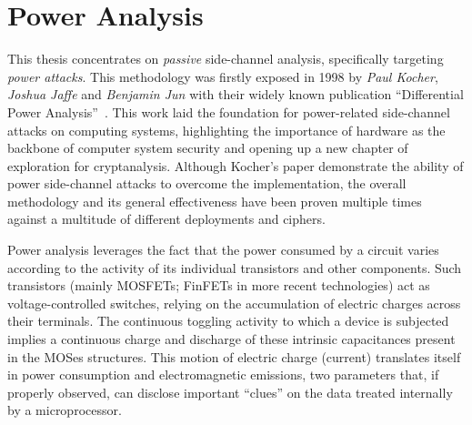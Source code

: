     \section{Power Analysis}\label{sec:pow}
        This thesis concentrates on \emph{passive} side-channel analysis, specifically targeting \emph{power attacks}. This methodology was firstly exposed in 1998 by \emph{Paul Kocher}, \emph{Joshua Jaffe} and \emph{Benjamin Jun} with their widely known publication ``Differential Power Analysis''~\cite{kocher1999differential}. This work laid the foundation for power-related side-channel attacks on computing systems, highlighting the importance of hardware as the backbone of computer system security and opening up a new chapter of exploration for cryptanalysis. Although Kocher's paper demonstrate the ability of power side-channel attacks to overcome the \des{} implementation, the overall methodology and its general effectiveness have been proven multiple times against a multitude of different deployments and ciphers. 
        
        Power analysis leverages the fact that the power consumed by a circuit varies according to the activity of its individual transistors and other components. Such transistors (mainly MOSFETs; FinFETs in more recent technologies) act as voltage-controlled switches, relying on the accumulation of electric charges across their terminals. The continuous toggling activity to which a device is subjected implies a continuous charge and discharge of these intrinsic capacitances present in the MOSes structures. This motion of electric charge (current) translates itself in power consumption and electromagnetic emissions, two parameters that, if properly observed, can disclose important ``clues'' on the data treated internally by a microprocessor.

